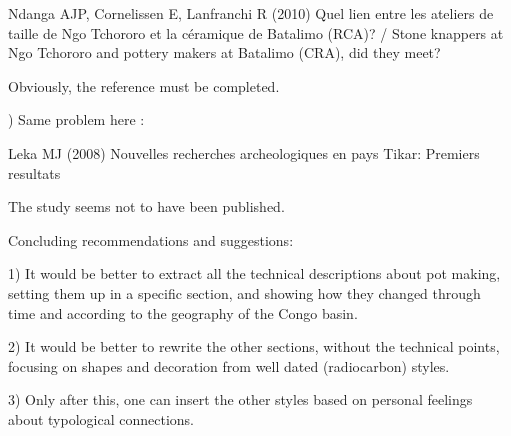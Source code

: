 \begin{reviewer}
Ndanga AJP, Cornelissen E, Lanfranchi R (2010) Quel lien entre les ateliers de taille de Ngo
Tchororo et la céramique de Batalimo (RCA)? / Stone knappers at Ngo Tchororo and pottery makers at Batalimo (CRA), did they meet?

Obviously, the reference must be completed.


) Same problem here :

Leka MJ (2008) Nouvelles recherches archeologiques en pays Tikar: Premiers resultats

The study seems not to have been published.


\point Concluding recommendations and suggestions:

1) It would be better to extract all the technical descriptions about pot making, setting them up in a specific section, and showing how they changed through time and according to the geography of the Congo basin.

2) It would be better to rewrite the other sections, without the technical points, focusing on shapes and decoration from well dated (radiocarbon) styles.

3) Only after this, one can insert the other styles based on personal feelings about typological connections.


\end{reviewer}

%



